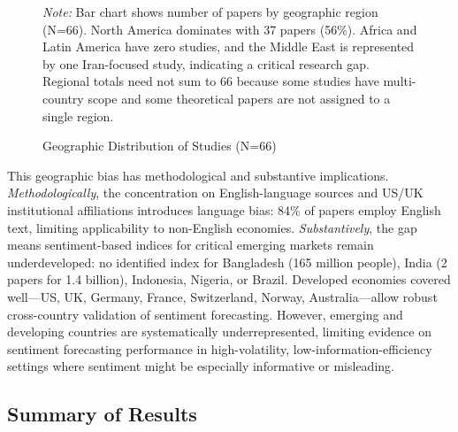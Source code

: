 \documentclass[11pt,twocolumn]{article}
\begin{document}
\begin{figure}[t]
\centering
\caption{Geographic Distribution of Studies (N=66)}
\label{fig:geographic}
\raggedright\footnotesize
\textit{Note:} Bar chart shows number of papers by geographic region (N=66). North America dominates with 37 papers (56\%). Africa and Latin America have zero studies, and the Middle East is represented by one Iran-focused study, indicating a critical research gap. Regional totals need not sum to 66 because some studies have multi-country scope and some theoretical papers are not assigned to a single region.
\end{figure}

This geographic bias has methodological and substantive implications. \emph{Methodologically}, the concentration on English-language sources and US/UK institutional affiliations introduces language bias: 84\% of papers employ English text, limiting applicability to non-English economies. \emph{Substantively}, the gap means sentiment-based indices for critical emerging markets remain underdeveloped: no identified index for Bangladesh (165 million people), India (2 papers for 1.4 billion), Indonesia, Nigeria, or Brazil. Developed economies covered well---US, UK, Germany, France, Switzerland, Norway, Australia---allow robust cross-country validation of sentiment forecasting. However, emerging and developing countries are systematically underrepresented, limiting evidence on sentiment forecasting performance in high-volatility, low-information-efficiency settings where sentiment might be especially informative or misleading.

\subsection{Summary of Results}
\end{document}
